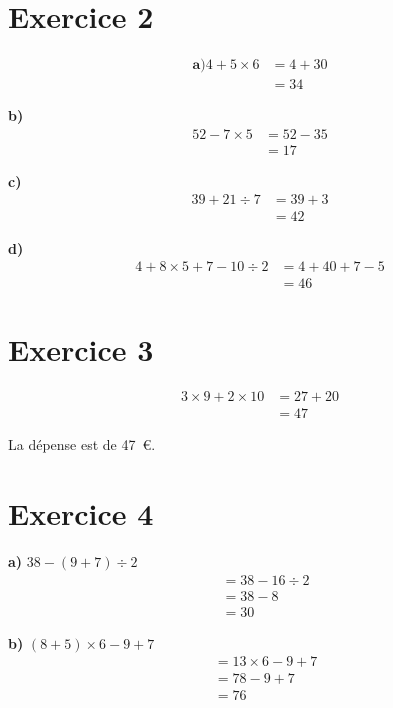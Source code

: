 \documentclass[12pt]{extarticle}
\begin{document}
\section*{Exercice 2}

\begin{align*}
\textbf{a)}
4 + 5 \times 6 &= 4 + 30 \\
               &= 34
\end{align*}

\textbf{b)}
\begin{align*}
52 - 7 \times 5 &= 52 - 35 \\
                &= 17
\end{align*}

\textbf{c)}
\begin{align*}
39 + 21 \div 7 &= 39 + 3 \\
               &= 42
\end{align*}

\textbf{d)}
\begin{align*}
4 + 8 \times 5 + 7 - 10 \div 2 &= 4 + 40 + 7 - 5 \\
                              &= 46
\end{align*}

\section*{Exercice 3}
\begin{align*}
3 \times 9 + 2 \times 10 &= 27 + 20 \\
                        &= 47
\end{align*}

La dépense est de 47~€.

\section*{Exercice 4}

\textbf{a)} $38 - (9 + 7) \div 2$
\begin{align*}
&= 38 - 16 \div 2 \\
&= 38 - 8 \\
&= 30
\end{align*}

\textbf{b)} $(8 + 5) \times 6 - 9 + 7$
\begin{align*}
&= 13 \times 6 - 9 + 7 \\
&= 78 - 9 + 7 \\
&= 76
\end{align*}
\end{document}
